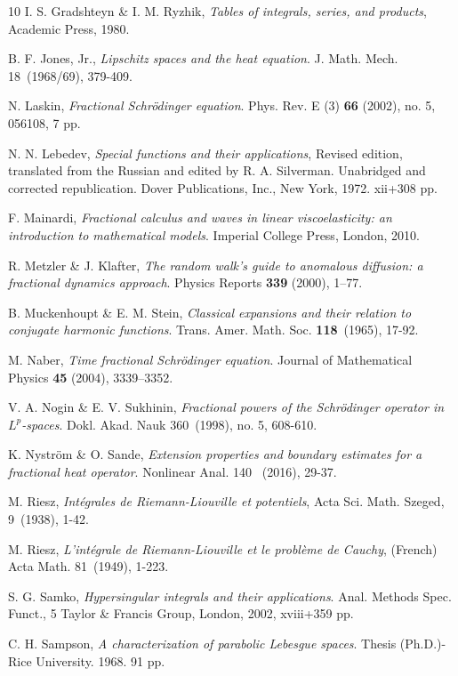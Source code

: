 \documentclass[11pt,letter]{amsart}
\numberwithin{equation}{section}
\numberwithin{equation}{section}
\begin{document}
\begin{thebibliography}{10}
I. S. Gradshteyn \& I. M. Ryzhik, \emph{Tables of integrals, series,
and products}, Academic Press, 1980.

B. F. Jones, Jr., \emph{Lipschitz spaces and the heat equation}.
J. Math. Mech. 18~(1968/69), 379-409.

N. Laskin, \emph{Fractional Schr\"odinger equation}. Phys. Rev. E (3) \textbf{66} (2002), no. 5, 056108, 7 pp.

N. N. Lebedev, \emph{Special functions and their applications}, Revised edition, translated from the Russian and edited by R. A. Silverman. Unabridged and corrected republication. Dover Publications, Inc., New York, 1972. xii+308 pp.

F. Mainardi, \emph{Fractional calculus and waves in linear viscoelasticity: an introduction to mathematical models}. Imperial College Press, London, 2010.

R. Metzler \& J. Klafter,
\emph{The random walk's guide to anomalous diffusion: a fractional dynamics approach}. Physics Reports \textbf{339} (2000), 1--77.

B. Muckenhoupt \& E. M. Stein, \emph{Classical expansions and their relation to conjugate harmonic functions}. 
Trans. Amer. Math. Soc. \textbf{118}~(1965), 17-92. 

M. Naber, \emph{Time fractional Schr\"odinger equation}. Journal of Mathematical Physics \textbf{45} (2004), 3339--3352.

V. A. Nogin \& E. V. Sukhinin, \emph{Fractional powers of the Schr\"odinger operator in $L^p$-spaces}. Dokl. Akad. Nauk 360~(1998), no. 5, 608-610.

K. Nystr\"om \& O. Sande, \emph{Extension properties and boundary estimates for a fractional heat operator}.
Nonlinear Anal. 140 ~(2016), 29-37.

M. Riesz, \emph{Int\'egrales de Riemann-Liouville et potentiels}, Acta Sci. Math. Szeged, 9~(1938), 1-42.

M. Riesz, \emph{L'int\'egrale de Riemann-Liouville et le probl\`eme de Cauchy}, (French) Acta Math. 81~(1949), 1-223.

S. G. Samko, \emph{Hypersingular integrals and their applications}.
Anal. Methods Spec. Funct., 5
Taylor \& Francis Group, London, 2002, xviii+359 pp.

C. H. Sampson, \emph{A characterization of parabolic Lebesgue spaces}. 
Thesis (Ph.D.)-Rice University. 1968. 91 pp.


\end{thebibliography}
\end{document}
